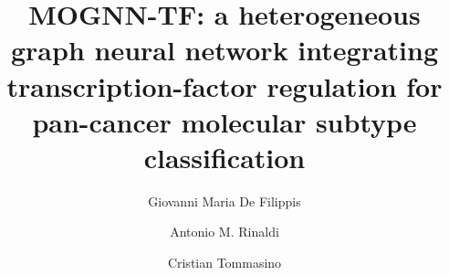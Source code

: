 \documentclass[review,3p,times,11pt, ]{elsarticle} %
\begin{document}
\begin{frontmatter}

\title{MOGNN-TF: a heterogeneous graph neural network integrating transcription-factor regulation for pan-cancer molecular subtype classification}





\author[unina]{Giovanni Maria De Filippis}

\author[unina]{Antonio M. Rinaldi}

\author[unina]{Cristian Tommasino}



%
\begin{abstract}


\end{abstract}
\end{frontmatter}
\end{document}
